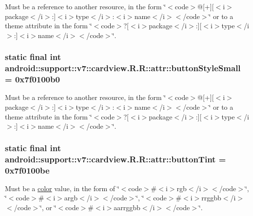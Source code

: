 Must be a reference to another resource, in the form \char`\"{}$<$code$>$@\mbox{[}+\mbox{]}\mbox{[}$<$i$>$package$<$/i$>$:\mbox{]}$<$i$>$type$<$/i$>$:$<$i$>$name$<$/i$>$$<$/code$>$\char`\"{} or to a theme attribute in the form \char`\"{}$<$code$>$?\mbox{[}$<$i$>$package$<$/i$>$:\mbox{]}\mbox{[}$<$i$>$type$<$/i$>$:\mbox{]}$<$i$>$name$<$/i$>$$<$/code$>$\char`\"{}. \hypertarget{classandroid_1_1support_1_1v7_1_1cardview_1_1_r_1_1attr_6cc783bd5c937ac6073fcc47ae4f2cda}{
\subsubsection[{buttonStyleSmall}]{\setlength{\rightskip}{0pt plus 5cm}static final int android::support::v7::cardview.R.R::attr::buttonStyleSmall = 0x7f0100b0}}
\label{classandroid_1_1support_1_1v7_1_1cardview_1_1_r_1_1attr_6cc783bd5c937ac6073fcc47ae4f2cda}


Must be a reference to another resource, in the form \char`\"{}$<$code$>$@\mbox{[}+\mbox{]}\mbox{[}$<$i$>$package$<$/i$>$:\mbox{]}$<$i$>$type$<$/i$>$:$<$i$>$name$<$/i$>$$<$/code$>$\char`\"{} or to a theme attribute in the form \char`\"{}$<$code$>$?\mbox{[}$<$i$>$package$<$/i$>$:\mbox{]}\mbox{[}$<$i$>$type$<$/i$>$:\mbox{]}$<$i$>$name$<$/i$>$$<$/code$>$\char`\"{}. \hypertarget{classandroid_1_1support_1_1v7_1_1cardview_1_1_r_1_1attr_9e3984ac4e5ccde6afed5cc98dd81547}{
\subsubsection[{buttonTint}]{\setlength{\rightskip}{0pt plus 5cm}static final int android::support::v7::cardview.R.R::attr::buttonTint = 0x7f0100be}}
\label{classandroid_1_1support_1_1v7_1_1cardview_1_1_r_1_1attr_9e3984ac4e5ccde6afed5cc98dd81547}


Must be a \hyperlink{classandroid_1_1support_1_1v7_1_1cardview_1_1_r_1_1color}{color} value, in the form of \char`\"{}$<$code$>$\#$<$i$>$rgb$<$/i$>$$<$/code$>$\char`\"{}, \char`\"{}$<$code$>$\#$<$i$>$argb$<$/i$>$$<$/code$>$\char`\"{}, \char`\"{}$<$code$>$\#$<$i$>$rrggbb$<$/i$>$$<$/code$>$\char`\"{}, or \char`\"{}$<$code$>$\#$<$i$>$aarrggbb$<$/i$>$$<$/code$>$\char`\"{}. 

